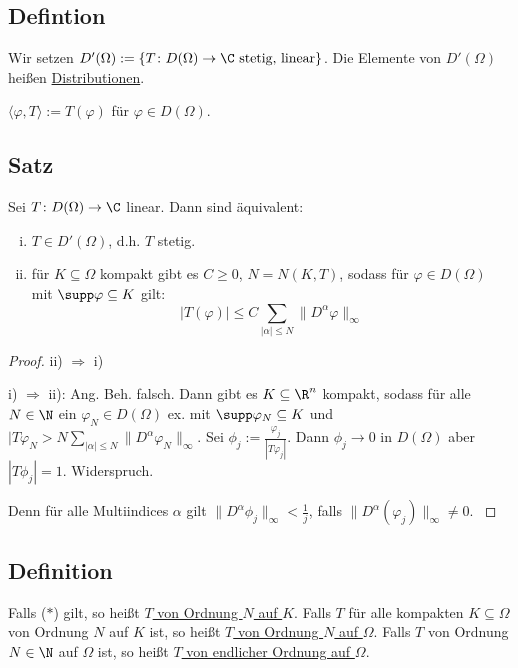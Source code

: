 \subsection{Defintion}
  Wir setzen $D'(\Omega) := \{T \colon D(\Omega) \to \C \text{ stetig, linear} \}$.
  Die Elemente von $D'(\Omega)$ heißen \underline{Distributionen}.

\begin{ntion}
  $\langle \varphi, T\rangle := T(\varphi)$ für $\varphi \in D(\Omega)$.
\end{ntion}

\subsection{Satz}
  Sei $T \colon D(\Omega) \to \C$ linear. Dann sind äquivalent:
  \begin{enumerate}[i)]
  \item $T \in D'(\Omega)$, d.h. $T$ stetig.
  \item für $K \subseteq \Omega$ kompakt gibt es $C \geq 0$, $N = N(K,T)$, sodass für $\varphi \in D(\Omega)$ mit $\supp \varphi \subseteq K$ gilt:
    \begin{displaymath}
      |T(\varphi)| \leq C \sum_{|\alpha| \leq N} \|D^\alpha \varphi\|_\infty \tag{$\ast$}
    \end{displaymath}
  \end{enumerate}

\begin{proof}
  ii) $\Rightarrow$ i) \checkmark

  i) $\Rightarrow$ ii): Ang. Beh. falsch. Dann gibt es $K \subseteq \R^n$ kompakt, sodass für alle $N \in \N$ ein $\varphi_N \in D(\Omega)$ ex. mit $\supp \varphi_N \subseteq K$ und $|T \varphi_N > N \sum_{|\alpha| \leq N} \|D^\alpha \varphi_N \|_{\infty}$.
  Sei $\phi_j := \frac{\varphi_j}{|T\varphi_j|}$.
  Dann $\phi_j \to 0$ in $D(\Omega)$ aber $|T\phi_j| = 1$.
  Widerspruch.

  \tiny{
    Denn für alle Multiindices $\alpha$ gilt $ \| D^\alpha \phi_j \|_\infty < \frac{1}{j} $, falls $\|D^\alpha(\varphi_j)\|_{\infty} \neq 0$.
  }
\end{proof}

\subsection{Definition}
  Falls ($\ast$) gilt, so heißt \underline{$T$ von Ordnung $N$ auf $K$}.
  Falls $T$ für alle kompakten $K \subseteq \Omega$ von Ordnung $N$ auf $K$ ist, so heißt \underline{$T$ von Ordnung $N$ auf $\Omega$}.
  Falls $T$ von Ordnung $N\in \N$ auf $\Omega$ ist, so heißt \underline{$T$ von endlicher Ordnung auf $\Omega$}.

